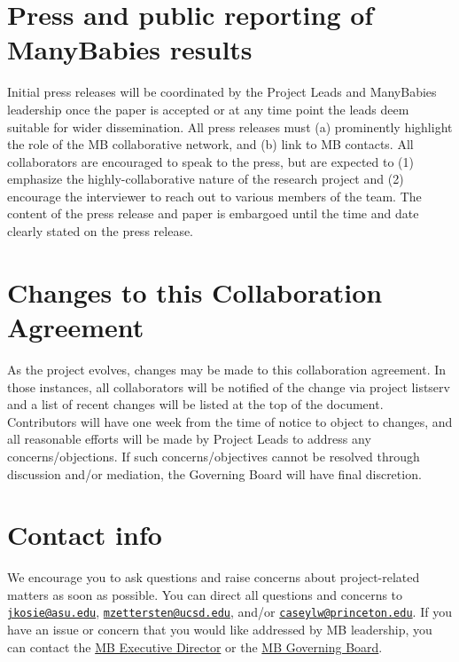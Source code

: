\documentclass[
  letterpaper,
  DIV=11,
  numbers=noendperiod,
  oneside]{scrreprt}
\begin{document}
\section*{Press and public reporting of ManyBabies
results}\label{press-and-public-reporting-of-manybabies-results}


Initial press releases will be coordinated by the Project Leads and
ManyBabies leadership once the paper is accepted or at any time point
the leads deem suitable for wider dissemination. All press releases must
(a) prominently highlight the role of the MB collaborative network, and
(b) link to MB contacts. All collaborators are encouraged to speak to
the press, but are expected to (1) emphasize the highly-collaborative
nature of the research project and (2) encourage the interviewer to
reach out to various members of the team. The content of the press
release and paper is embargoed until the time and date clearly stated on
the press release.

\section*{Changes to this Collaboration
Agreement}\label{changes-to-this-collaboration-agreement}


As the project evolves, changes may be made to this collaboration
agreement. In those instances, all collaborators will be notified of the
change via project listserv and a list of recent changes will be listed
at the top of the document. Contributors will have one week from the
time of notice to object to changes, and all reasonable efforts will be
made by Project Leads to address any concerns/objections. If such
concerns/objectives cannot be resolved through discussion and/or
mediation, the Governing Board will have final discretion.

\section*{Contact info}\label{contact-info-1}


We encourage you to ask questions and raise concerns about
project-related matters as soon as possible. You can direct all
questions and concerns to
\href{mailto:jkosie@asu.edu}{\nolinkurl{jkosie@asu.edu}},
\href{mailto:mzettersten@ucsd.edu}{\nolinkurl{mzettersten@ucsd.edu}},
and/or
\href{mailto:caseylw@princeton.edu}{\nolinkurl{caseylw@princeton.edu}}.
If you have an issue or concern that you would like addressed by MB
leadership, you can contact the \href{mailto:contact@manybabies.org}{MB
Executive Director} or the \href{mailto:govboard@manybabies.org}{MB
Governing Board}.
\end{document}
